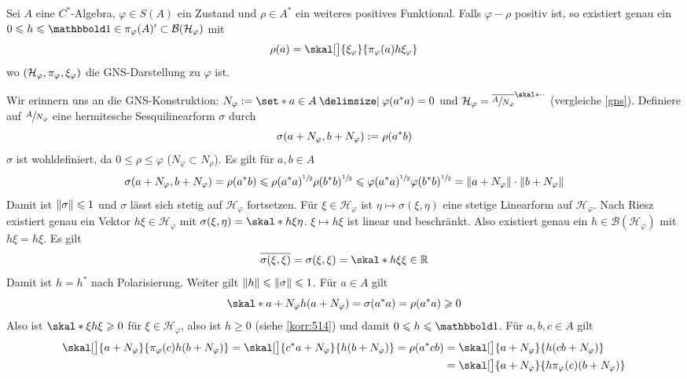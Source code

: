 \begin{proposition}[label=prop:71]
	Sei $A$ eine $C^*$-Algebra, $\varphi \in S(A)$ ein Zustand und $\rho \in A^*$ ein weiteres positives Funktional.
	Falls $\varphi-\rho$ positiv ist, so existiert genau ein $0 \le h \le \ind \in \pi_\varphi(A)' \subset \mathcal{B}(\mathcal{H}_\varphi)$ mit 
	\[
		\rho(a) = \skal[\big]{\xi_\varphi}{\pi_\varphi(a)h \xi_\varphi}
	\]
	wo $\enbrace*{\mathcal{H}_\varphi,\pi_\varphi,\xi_\varphi}$ die GNS-Darstellung zu $\varphi$ ist.
\end{proposition}
\begin{beweis}
	Wir erinnern uns an die GNS-Konstruktion: $N_\varphi := \set*{a \in A \given \varphi(a^*a)=0}$ und $\mathcal{H}_\varphi = \overline{\sfrac{A}{N_\varphi}}^{\skal*{\cdot}{\cdot}}$ (vergleiche \autoref{gns}).
	Definiere auf $\sfrac{A}{N_\varphi}$ eine hermitesche Sesquilinearform $\sigma$ durch 
	\[
		\sigma \enbrace*{a + N_\varphi, b+ N_\varphi} := \rho(a^* b)
	\]
	$\sigma$ ist wohldefiniert, da $0 \le \rho \le \varphi$ ($N_\varphi \subset N_\rho$).
	Es gilt für $a,b \in A$
	\[
		\sigma \enbrace*{a+ N_\varphi, b+N_\varphi} = \rho(a^*b) \le \rho(a^*a)^{\sfrac{1}{2}} \rho(b^*b)^{\sfrac{1}{2}} \le \varphi(a^*a)^{\sfrac{1}{2}} \varphi(b^*b)^{\sfrac{1}{2}} 
		= \norm*{a + N_\varphi} \cdot \norm*{b+ N_\varphi}
	\]
	Damit ist $\norm*{\sigma}\le 1$ und $\sigma$ lässt sich stetig auf $\mathcal{H}_\varphi$ fortsetzen.
	Für $\xi \in \mathcal{H}_\varphi$ ist $\eta \mapsto \sigma(\xi,\eta)$ eine stetige Linearform auf $\mathcal{H}_\varphi$.
	Nach Riesz existiert genau ein Vektor $h \xi\in \mathcal{H}_\varphi$ mit $\sigma(\xi,\eta) = \skal*{h \xi}{\eta}$.
	$\xi \mapsto h \xi$ ist linear und beschränkt. 
	Also existiert genau ein $h \in \mathcal{B}(\mathcal{H}_\varphi)$ mit $h \xi= h \xi$.
	Es gilt 
	\[
		\overline{\sigma(\xi,\xi)}=\sigma(\xi,\xi)= \skal*{h \xi}{\xi} \in \mathbb{R}
	\]
	Damit ist $h=h^*$ nach Polarisierung.
	Weiter gilt $\norm*{h} \le \norm*{\sigma} \le 1$.
	Für $a \in A$ gilt 
	\[
		\skal*{a + N_\varphi}{h \enbrace*{a+ N_\varphi}}= \sigma(a^*a)=\rho(a^*a)\ge 0
	\]
	Also ist $\skal*{\xi}{h \xi} \ge 0$ für $\xi \in \mathcal{H}_\varphi$, also ist $h \ge 0$ (siehe \autoref{korr:514}) und damit $0 \le h \le \ind$.
	Für $a,b,c \in A$ gilt 
	\begin{align}
		\skal[\big]{a + N_\varphi}{\pi_\varphi(c)h (b+N_\varphi)} = \skal[\big]{c^*a + N_\varphi}{h(b+N_\varphi)} = \rho \enbrace*{a^*cb} &= \skal[\big]{a + N_\varphi}{h(cb+N_\varphi)} \\
		&= \skal[\big]{a+ N_\varphi}{h \pi_\varphi(c)(b+ N_\varphi)}

\end{align}
\end{beweis}
